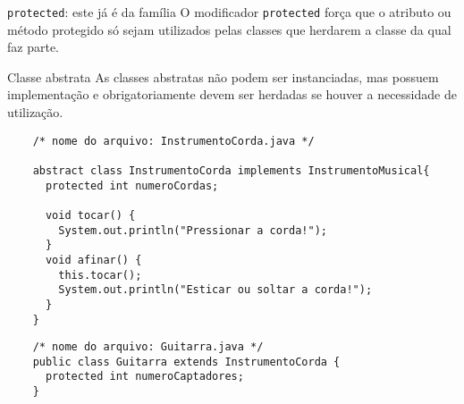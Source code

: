\begin{frame}{{\tt protected}: este já é da família}
  O modificador \alert{{\tt protected}} força que o \alert{atributo}
  ou \alert{método} protegido só sejam utilizados pelas classes que
  herdarem a classe da qual faz parte.
  \hspace{-1.33cm}
    \begin{center}
    
  \end{center}
  

\end{frame}


\begin{frame}[fragile]{Classe abstrata}
  \footnotesize
  As classes abstratas não podem ser instanciadas, mas possuem
  implementação e obrigatoriamente devem ser herdadas se houver a
  necessidade de utilização.
  
  \begin{lstlisting}
    /* nome do arquivo: InstrumentoCorda.java */

    abstract class InstrumentoCorda implements InstrumentoMusical{
      protected int numeroCordas;
      
      void tocar() {
        System.out.println("Pressionar a corda!"); 
      }
      void afinar() {
        this.tocar();
        System.out.println("Esticar ou soltar a corda!"); 
      }
    }
  \end{lstlisting}
  
  \begin{lstlisting}
    /* nome do arquivo: Guitarra.java */
    public class Guitarra extends InstrumentoCorda {
      protected int numeroCaptadores;
    }
  \end{lstlisting}

\end{frame}

